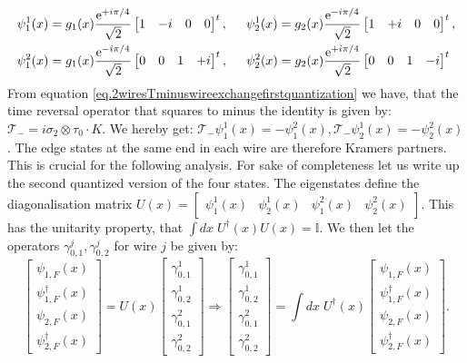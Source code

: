 \begin{align}
\psi^1_1(x) &= g_1(x)\frac{\text{e}^{+i\pi/4}}{\sqrt{2}}\begin{bmatrix} 1 & -i & 0 & 0 \end{bmatrix}^t , \hspace{0.5cm} \psi^1_2(x) = g_2(x)\frac{\text{e}^{-i\pi/4}}{\sqrt{2}}\begin{bmatrix} 1 & +i & 0 & 0 \end{bmatrix}^t, \nonumber \\
\psi^2_1(x) &= g_1(x)\frac{\text{e}^{-i\pi/4}}{\sqrt{2}}\begin{bmatrix} 0 & 0 & 1 & +i \end{bmatrix}^t , \hspace{0.5cm} \psi^2_2(x) = g_2(x)\frac{\text{e}^{+i\pi/4}}{\sqrt{2}}\begin{bmatrix} 0 & 0 & 1 & -i \end{bmatrix}^t
\end{align}
From equation \eqref{eq.2wiresTminuswireexchangefirstquantization} we have, that the time reversal operator that squares to minus the identity is given by: $\mathcal{T}_- = i\sigma_2\otimes\tau_0 \cdot K$. We hereby get: $\mathcal{T}_-\psi^1_1(x) = -\psi^2_1(x), \mathcal{T}_-\psi^1_2(x) = -\psi^2_2(x)$. The edge states at the same end in each wire are therefore Kramers partners. This is crucial for the following analysis. For sake of completeness let us write up the second quantized version of the four states. The eigenstates define the diagonalisation matrix $U(x) = \begin{bmatrix} \psi^{1}_{1}(x) & \psi^{1}_{2}(x) & \psi^{2}_{1}(x) & \psi^{2}_{2}(x) \end{bmatrix}$. This has the unitarity property, that $\int dx \; U^\dagger(x) U(x) = \mathbb{I}$. We then let the operators $\gamma^{j}_{0,1}, \gamma^{j}_{0,2}$ for wire $j$ be given by:
\begin{equation}
\begin{bmatrix} \psi_{1,F}(x) \\ \psi_{1,F}^\dagger(x) \\ \psi_{2,F}(x) \\ \psi_{2,F}^\dagger(x) \end{bmatrix} = U(x) \begin{bmatrix} \gamma^{1}_{0,1} \\ \gamma^{1}_{0,2} \\ \gamma^{2}_{0,1} \\ \gamma^{2}_{0,2} \end{bmatrix} \Rightarrow \begin{bmatrix} \gamma^{1}_{0,1} \\ \gamma^{1}_{0,2} \\ \gamma^{2}_{0,1} \\ \gamma^{2}_{0,2} \end{bmatrix} = \int dx \; U^\dagger(x) \begin{bmatrix} \psi_{1,F}(x) \\ \psi_{1,F}^\dagger(x) \\ \psi_{2,F}(x) \\ \psi_{2,F}^\dagger(x) \end{bmatrix}.
\label{eq.Majoranaedgemodedef} 
\end{equation} 
